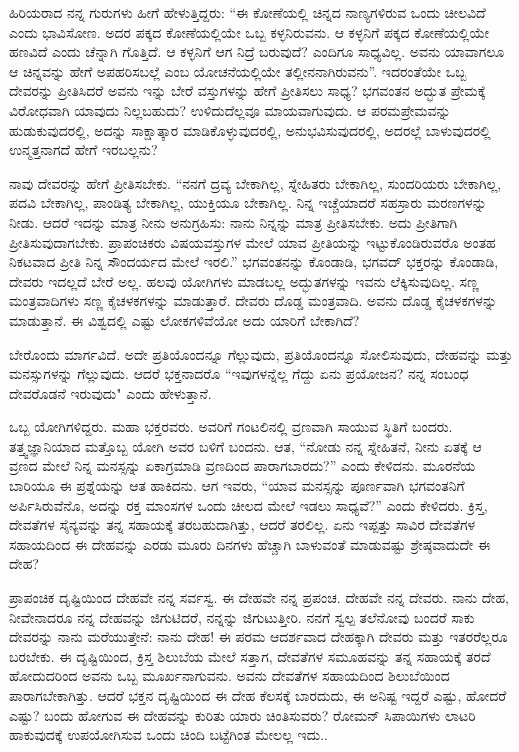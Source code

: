 ಹಿರಿಯರಾದ ನನ್ನ ಗುರುಗಳು ಹೀಗೆ ಹೇಳುತ್ತಿದ್ದರು: “ಈ ಕೋಣೆಯಲ್ಲಿ ಚಿನ್ನದ ನಾಣ್ಯಗಳಿರುವ ಒಂದು ಚೀಲವಿದೆ ಎಂದು ಭಾವಿಸೋಣ. ಅದರ ಪಕ್ಕದ ಕೋಣೆಯಲ್ಲಿಯೇ ಒಬ್ಬ ಕಳ್ಳನಿರುವನು. ಆ ಕಳ್ಳನಿಗೆ ಪಕ್ಕದ ಕೋಣೆಯಲ್ಲಿಯೇ ಹಣವಿದೆ ಎಂದು ಚೆನ್ನಾಗಿ ಗೊತ್ತಿದೆ. ಆ ಕಳ್ಳನಿಗೆ ಆಗ ನಿದ್ರೆ ಬರುವುದೆ? ಎಂದಿಗೂ ಸಾಧ್ಯವಿಲ್ಲ. ಅವನು ಯಾವಾಗಲೂ ಆ ಚಿನ್ನವನ್ನು ಹೇಗೆ ಅಪಹರಿಸಬಲ್ಲೆ ಎಂಬ ಯೋಚನೆಯಲ್ಲಿಯೇ ತಲ್ಲೀನನಾಗಿರುವನು''. ಇದರಂತೆಯೇ ಒಬ್ಬ ದೇವರನ್ನು ಪ್ರೀತಿಸಿದರೆ ಅವನು ಇನ್ನು ಬೇರೆ ವಸ್ತುಗಳನ್ನು ಹೇಗೆ ಪ್ರೀತಿಸಲು ಸಾಧ್ಯ? ಭಗವಂತನ ಅದ್ಭುತ ಪ್ರೇಮಕ್ಕೆ ವಿರೋಧವಾಗಿ ಯಾವುದು ನಿಲ್ಲಬಹುದು? ಉಳಿದುದೆಲ್ಲವೂ ಮಾಯವಾಗುವುದು. ಆ ಪರಮಪ್ರೇಮವನ್ನು ಹುಡುಕುವುದರಲ್ಲಿ, ಅದನ್ನು ಸಾಕ್ಷಾತ್ಕಾರ ಮಾಡಿಕೊಳ್ಳುವುದರಲ್ಲಿ, ಅನುಭವಿಸುವುದರಲ್ಲಿ, ಅದರಲ್ಲೆ ಬಾಳುವುದರಲ್ಲಿ ಉನ್ಮತ್ತನಾಗದೆ ಹೇಗೆ ಇರಬಲ್ಲನು?

ನಾವು ದೇವರನ್ನು ಹೇಗೆ ಪ್ರೀತಿಸಬೇಕು. “ನನಗೆ ದ್ರವ್ಯ ಬೇಕಾಗಿಲ್ಲ, ಸ್ನೇಹಿತರು ಬೇಕಾಗಿಲ್ಲ, ಸುಂದರಿಯರು ಬೇಕಾಗಿಲ್ಲ, ಪದವಿ ಬೇಕಾಗಿಲ್ಲ, ಪಾಂಡಿತ್ಯ ಬೇಕಾಗಿಲ್ಲ, ಯುಕ್ತಿಯೂ ಬೇಕಾಗಿಲ್ಲ. ನಿನ್ನ ಇಚ್ಚೆಯಾದರೆ ಸಹಸ್ರಾರು ಮರಣಗಳನ್ನು ನೀಡು. ಆದರೆ ಇದನ್ನು ಮಾತ್ರ ನೀನು ಅನುಗ್ರಹಿಸು: ನಾನು ನಿನ್ನನ್ನು ಮಾತ್ರ ಪ್ರೀತಿಸಬೇಕು. ಅದು ಪ್ರೀತಿಗಾಗಿ ಪ್ರೀತಿಸುವುದಾಗಬೇಕು. ಪ್ರಾಪಂಚಿಕರು ವಿಷಯವಸ್ತುಗಳ ಮೇಲೆ ಯಾವ ಪ್ರೀತಿಯನ್ನು ಇಟ್ಟುಕೊಂಡಿರುವರೊ ಅಂತಹ ನಿಕಟವಾದ ಪ್ರೀತಿ ನಿನ್ನ ಸೌಂದರ್ಯದ ಮೇಲೆ ಇರಲಿ.” ಭಗವಂತನನ್ನು ಕೊಂಡಾಡಿ, ಭಗವದ್ ಭಕ್ತರನ್ನು ಕೊಂಡಾಡಿ, ದೇವರು ಇದಲ್ಲದೆ ಬೇರೆ ಅಲ್ಲ. ಹಲವು ಯೋಗಿಗಳು ಮಾಡಬಲ್ಲ ಅದ್ಭುತಗಳನ್ನು ಇವನು ಲೆಕ್ಕಿಸುವುದಿಲ್ಲ. ಸಣ್ಣ ಮಂತ್ರವಾದಿಗಳು ಸಣ್ಣ ಕೈಚಳಕಗಳನ್ನು ಮಾಡುತ್ತಾರೆ. ದೇವರು ದೊಡ್ಡ ಮಂತ್ರವಾದಿ. ಅವನು ದೊಡ್ಡ ಕೈಚಳಕಗಳನ್ನು ಮಾಡುತ್ತಾನೆ. ಈ ವಿಶ್ವದಲ್ಲಿ ಎಷ್ಟು ಲೋಕಗಳಿವೆಯೋ ಅದು ಯಾರಿಗೆ ಬೇಕಾಗಿದೆ?

\newpage

ಬೇರೊಂದು ಮಾರ್ಗವಿದೆ. ಅದೇ ಪ್ರತಿಯೊಂದನ್ನೂ ಗೆಲ್ಲುವುದು, ಪ್ರತಿಯೊಂದನ್ನೂ ಸೋಲಿಸುವುದು, ದೇಹವನ್ನು ಮತ್ತು ಮನಸ್ಸುಗಳನ್ನು ಗೆಲ್ಲುವುದು. ಆದರೆ ಭಕ್ತನಾದರೊ “ಇವುಗಳನ್ನೆಲ್ಲ ಗೆದ್ದು ಏನು ಪ್ರಯೋಜನ? ನನ್ನ ಸಂಬಂಧ ದೇವರೊಡನೆ ಇರುವುದು" ಎಂದು ಹೇಳುತ್ತಾನೆ.

ಒಬ್ಬ ಯೋಗಿಗಳಿದ್ದರು. ಮಹಾ ಭಕ್ತರವರು. ಅವರಿಗೆ ಗಂಟಲಿನಲ್ಲಿ ವ್ರಣವಾಗಿ ಸಾಯುವ ಸ್ಥಿತಿಗೆ ಬಂದರು. ತತ್ತ್ವಜ್ಞಾನಿಯಾದ ಮತ್ತೊಬ್ಬ ಯೋಗಿ ಅವರ ಬಳಿಗೆ ಬಂದನು. ಆತ, “ನೋಡು ನನ್ನ ಸ್ನೇಹಿತನೆ, ನೀನು ಏತಕ್ಕೆ ಆ ವ್ರಣದ ಮೇಲೆ ನಿನ್ನ ಮನಸ್ಸನ್ನು ಏಕಾಗ್ರಮಾಡಿ ವ್ರಣದಿಂದ ಪಾರಾಗಬಾರದು?” ಎಂದು ಕೇಳಿದನು. ಮೂರನೆಯ ಬಾರಿಯೂ ಈ ಪ್ರಶ್ನೆಯನ್ನು ಆತ ಹಾಕಿದನು. ಆಗ ಇವರು, “ಯಾವ ಮನಸ್ಸನ್ನು ಪೂರ್ಣವಾಗಿ ಭಗವಂತನಿಗೆ ಅರ್ಪಿಸಿರುವೆನೊ, ಅದನ್ನು ರಕ್ತ ಮಾಂಸಗಳ ಒಂದು ಚೀಲದ ಮೇಲೆ ಇಡಲು ಸಾಧ್ಯವೆ?” ಎಂದು ಕೇಳಿದರು. ಕ್ರಿಸ್ತ, ದೇವತೆಗಳ ಸೈನ್ಯವನ್ನು ತನ್ನ ಸಹಾಯಕ್ಕೆ ತರಬಹುದಾಗಿತ್ತು, ಆದರೆ ತರಲಿಲ್ಲ. ಏನು ಇಪ್ಪತ್ತು ಸಾವಿರ ದೇವತೆಗಳ ಸಹಾಯದಿಂದ ಈ ದೇಹವನ್ನು ಎರಡು ಮೂರು ದಿನಗಳು ಹೆಚ್ಚಾಗಿ ಬಾಳುವಂತೆ ಮಾಡುವಷ್ಟು ಶ್ರೇಷ್ಠವಾದುದೇ ಈ ದೇಹ?

ಪ್ರಾಪಂಚಿಕ ದೃಷ್ಟಿಯಿಂದ ದೇಹವೇ ನನ್ನ ಸರ್ವಸ್ವ. ಈ ದೇಹವೇ ನನ್ನ ಪ್ರಪಂಚ. ದೇಹವೇ ನನ್ನ ದೇವರು. ನಾನು ದೇಹ, ನೀವೇನಾದರೂ ನನ್ನ ದೇಹವನ್ನು ಜಿಗುಟಿದರೆ, ನನ್ನನ್ನು ಜಿಗುಟುತ್ತೀರಿ. ನನಗೆ ಸ್ವಲ್ಪ ತಲೆನೋವು ಬಂದರೆ ಸಾಕು ದೇವರನ್ನು ನಾನು ಮರೆಯುತ್ತೇನೆ: ನಾನು ದೇಹ! ಈ ಪರಮ ಆದರ್ಶವಾದ ದೇಹಕ್ಕಾಗಿ ದೇವರು ಮತ್ತು ಇತರರೆಲ್ಲರೂ ಬರಬೇಕು. ಈ ದೃಷ್ಟಿಯಿಂದ, ಕ್ರಿಸ್ತ ಶಿಲುಬೆಯ ಮೇಲೆ ಸತ್ತಾಗ, ದೇವತೆಗಳ ಸಮೂಹವನ್ನು ತನ್ನ ಸಹಾಯಕ್ಕೆ ತರದೆ ಹೋದುದರಿಂದ ಅವನು ಒಬ್ಬ ಮೂರ್ಖನಾಗುವನು. ಅವನು ದೇವತೆಗಳ ಸಹಾಯದಿಂದ ಶಿಲುಬೆಯಿಂದ ಪಾರಾಗಬೇಕಾಗಿತ್ತು. ಆದರೆ ಭಕ್ತನ ದೃಷ್ಟಿಯಿಂದ ಈ ದೇಹ ಕೆಲಸಕ್ಕೆ ಬಾರದುದು, ಈ ಅನಿಷ್ಟ ಇದ್ದರೆ ಎಷ್ಟು, ಹೋದರೆ ಎಷ್ಟು? ಬಂದು ಹೋಗುವ ಈ ದೇಹವನ್ನು ಕುರಿತು ಯಾರು ಚಿಂತಿಸುವರು? ರೋಮನ್ ಸಿಪಾಯಿಗಳು ಲಾಟರಿ ಹಾಕುವುದಕ್ಕೆ ಉಪಯೋಗಿಸುವ ಒಂದು ಚಿಂದಿ ಬಟ್ಟೆಗಿಂತ ಮೇಲಲ್ಲ ಇದು..

